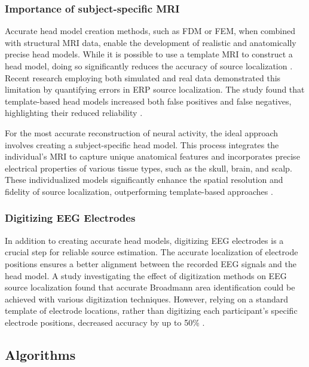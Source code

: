 \subsubsection{Importance of subject-specific MRI}

Accurate head model creation methods, such as FDM or FEM, when combined with structural MRI data, enable the development of realistic and anatomically precise head models. While it is possible to use a template MRI to construct a head model, doing so significantly reduces the accuracy of source localization \cite{brodbeckElectroencephalographicSourceImaging2011}. Recent research employing both simulated and real data demonstrated this limitation by quantifying errors in ERP source localization. The study found that template-based head models increased both false positives and false negatives, highlighting their reduced reliability \cite{depuydtInvestigatingEffectTemplate2024}.

For the most accurate reconstruction of neural activity, the ideal approach involves creating a subject-specific head model. This process integrates the individual’s MRI to capture unique anatomical features and incorporates precise electrical properties of various tissue types, such as the skull, brain, and scalp. These individualized models significantly enhance the spatial resolution and fidelity of source localization, outperforming template-based approaches \cite{akalinacarEffectsForwardModel2013}.

\subsubsection{Digitizing EEG Electrodes}

In addition to creating accurate head models, digitizing EEG electrodes is a crucial step for reliable source estimation. The accurate localization of electrode positions ensures a better alignment between the recorded EEG signals and the head model. A study investigating the effect of digitization methods on EEG source localization found that accurate Broadmann area identification could be achieved with various digitization techniques. However, relying on a standard template of electrode locations, rather than digitizing each participant's specific electrode positions, decreased accuracy by up to 50\% \cite{shiraziMoreReliableEEG2019}.

\subsection{Algorithms}

